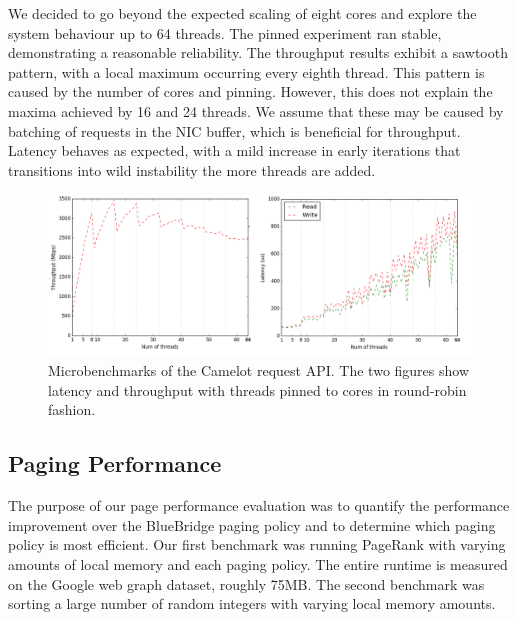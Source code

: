 We decided to go beyond the expected scaling of eight cores and explore the system behaviour up to 64 threads. The pinned experiment ran stable, demonstrating a reasonable reliability. The throughput results exhibit a sawtooth pattern, with a local maximum occurring  every eighth thread. This pattern is caused by the number of cores and pinning. However, this does not explain the maxima achieved by 16 and 24 threads. We assume that these may be caused by batching of requests in the NIC buffer, which is beneficial for throughput.
Latency behaves as expected, with a mild increase in early iterations that transitions into wild instability the more threads are added.

\begin{figure}[H]
    \includegraphics[width=\textwidth]{fig/threads_pinned}
    \caption{Microbenchmarks of the Camelot request API. The two figures show latency and throughput with threads pinned to cores in round-robin fashion.}
    \label{fig:threads}
\end{figure}

\subsection{Paging Performance}
The purpose of our page performance evaluation was to quantify the performance improvement over the BlueBridge paging policy and to determine which paging policy is most efficient. Our first benchmark was running PageRank with varying amounts of local memory and each paging policy. The entire runtime is measured on the Google web graph dataset, roughly 75MB. The second benchmark was sorting a large number of random integers with varying local memory amounts.

